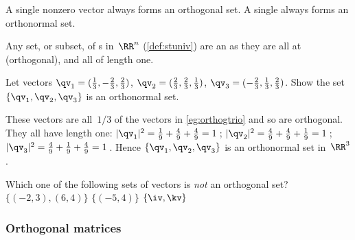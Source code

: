 A single nonzero vector always forms an orthogonal set.  
A single  always forms an orthonormal set.


\begin{example} \label{eg:}
Any set, or subset, of s in~\(\RR^n\) (\autoref{def:stuniv}) are an  as they are all at  (orthogonal), and all of length one.
\end{example}

\begin{example} \label{eg:}
Let vectors \(\qv_1=(\frac13,-\frac23,\frac23)\), \(\qv_2=(\frac23,\frac23,\frac13)\), \(\qv_3=(-\frac23,\frac13,\frac23)\).  
Show the set \(\{\qv_1,\qv_2,\qv_3\}\) is an orthonormal set.
\begin{solution} 
These vectors are all~\(1/3\) of the vectors in \autoref{eg:orthogtrio} and so are orthogonal.
They all have length one:
\(|\qv_1|^2={\frac19+\frac49+\frac49}=1\)\,;
\(|\qv_2|^2={\frac49+\frac49+\frac19}=1\)\,;
\(|\qv_3|^2={\frac49+\frac19+\frac49}=1\)\,.
Hence \(\{\qv_1,\qv_2,\qv_3\}\) is an orthonormal set in~\(\RR^3\). 
\end{solution}
\end{example}



\begin{activity}
Which one of the following sets of vectors is \emph{not} an orthogonal set?
{\(\{(-2,3),(6,4)\}\)}
{\(\{(-5,4)\}\)}
{\(\{\iv,\kv\}\)}
\end{activity}





\subsubsection{Orthogonal matrices}

